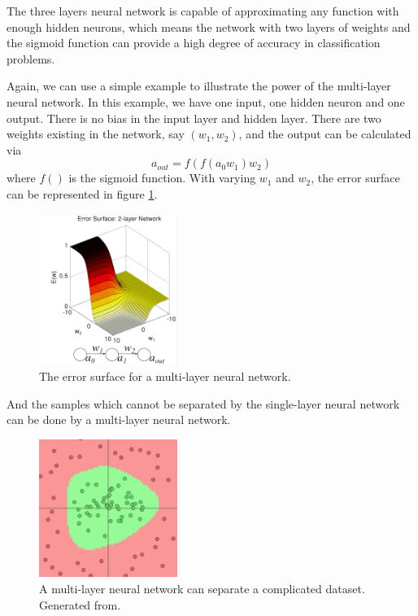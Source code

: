 The three layers neural network is capable of approximating any function with enough hidden neurons, which means the network with two layers of weights and the sigmoid function can provide a high degree of accuracy in classification problems. 

Again, we can use a simple example to illustrate the power of the multi-layer neural network. In this example, we have one input, one hidden neuron and one output. There is no bias in the input layer and hidden layer. There are two weights existing in the network, say $(w_{1}, w_{2})$, and the output can be calculated via
\begin{equation}\label{eq:2LayerExample}
a_{out} = f(f(a_{0}w_{1})w_{2})
\end{equation}
where $f()$ is the sigmoid function. With varying $w_{1}$ and $w_{2}$, the error surface can be represented in figure \ref{fig:2LayerErrorSurface}.
\graphicspath{ {./Figures/} }
\begin{figure}[!htb]
\centering
\includegraphics[width=0.4\textwidth]{2LayerErrorSurface.png}
\caption{\label{fig:2LayerErrorSurface}The error surface for a multi-layer neural network\citep{ErrorFigure1}.}
\end{figure}
And the samples which cannot be separated by the single-layer neural network can be done by a multi-layer neural network.
\graphicspath{ {./Figures/} }
\begin{figure}[!htb]
\centering
\includegraphics[width=0.4\textwidth]{MultiLayerCircleData.png}
\caption{\label{fig:MultiLayerErrorSurface}A multi-layer neural network can separate a complicated dataset. Generated from\citep{GenerateNN}.}
\end{figure}

